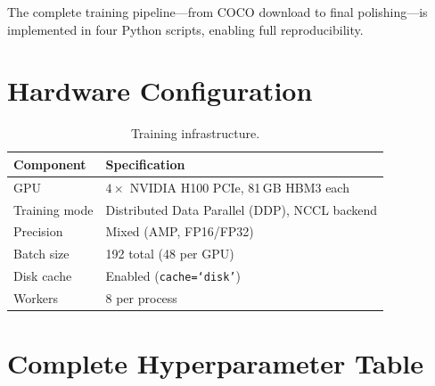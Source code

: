 \documentclass[12pt, titlepage]{article}
\begin{document}
\noindent The complete training pipeline---from COCO download to
final polishing---is implemented in four Python scripts, enabling
full reproducibility.





\newpage

\appendix

\section{Hardware Configuration}
\label{app:hardware}

\begin{table}[h]
  \centering
  \caption{Training infrastructure.}
  \label{tab:hardware}
  \begin{tabular}{@{}ll@{}}
    \toprule
    \textbf{Component} & \textbf{Specification}                         \\
    \midrule
    GPU                & $4{\times}$ NVIDIA H100 PCIe, 81\,GB HBM3 each \\
    Training mode      & Distributed Data Parallel (DDP), NCCL backend  \\
    Precision          & Mixed (AMP, FP16/FP32)                         \\
    Batch size         & 192 total (48 per GPU)                         \\
    Disk cache         & Enabled (\texttt{cache=`disk'})                \\
    Workers            & 8 per process                                  \\
    \bottomrule
  \end{tabular}
\end{table}

\section{Complete Hyperparameter Table}
\label{app:hyperparams}
\end{document}
